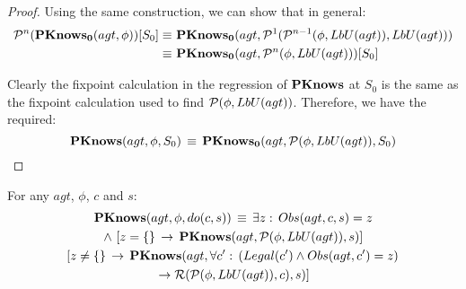 \begin{proof}
Using the same construction, we can show that in general:\begin{align*}
\mathcal{P}^{n}(\mathbf{PKnows_{0}}(agt,\phi))[S_{0}]\equiv\,\, & \mathbf{PKnows_{0}}(agt,\mathcal{P}^{1}(\mathcal{P}^{n-1}(\phi,LbU(agt)),LbU(agt)))\\
\equiv\,\, & \mathbf{PKnows_{0}}(agt,\mathcal{P}^{n}(\phi,LbU(agt)))[S_{0}]\end{align*}


Clearly the fixpoint calculation in the regression of $\mathbf{PKnows}$ at
$S_{0}$ is the same as the fixpoint calculation used to find $\mathcal{P}(\phi,LbU(agt))$.
Therefore, we have the required:\[
\mathbf{PKnows}(agt,\phi,S_{0})\,\equiv\,\mathbf{PKnows_{0}}(agt,\mathcal{P}(\phi,LbU(agt)),S_{0})\]

\end{proof}
\medskip{}


\begin{lemmaext}
[\ref{lem:Pknows_LbU_do}] For any $agt$, $\phi$, $c$ and
$s$:\begin{multline*}
\mathbf{PKnows}(agt,\phi,do(c,s))\,\equiv\,\exists z:\, Obs(agt,c,s)=z\\
\wedge\,\left[z=\{\}\,\rightarrow\,\mathbf{PKnows}(agt,\mathcal{P}(\phi,LbU(agt)),s)\right]\\
\left[z\neq\{\}\,\rightarrow\,\mathbf{PKnows}(agt,\forall c':\,\left(Legal(c')\wedge Obs(agt,c')=z\right)\right.\\
\left.\rightarrow\mathcal{R}(\mathcal{P}(\phi,LbU(agt)),c),s)\right]\end{multline*}

\end{lemmaext}
